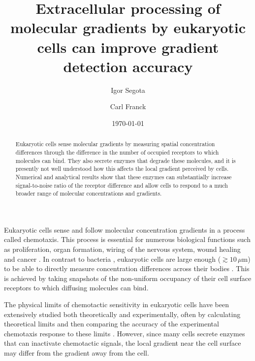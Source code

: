 \documentclass[%
 reprint,
 amsmath,amssymb,
 aps,prl,
 showpacs,
 linenumbers
]{revtex4-1}
\begin{document}


\title{Extracellular processing of molecular gradients by eukaryotic cells can improve gradient detection accuracy}

\author{Igor Segota}
\author{Carl Franck}%

\date{\today}

\begin{abstract}

Eukaryotic cells sense molecular gradients by measuring spatial concentration differences through the difference in the number of occupied receptors to which molecules can bind. They also secrete enzymes that degrade these molecules, and it is presently not well understood how this affects the local gradient perceived by cells. Numerical and analytical results show that these enzymes can substantially increase signal-to-noise ratio of the receptor difference and allow cells to respond to a much broader range of molecular concentrations and gradients. 

\end{abstract}

\maketitle

%
%
%
%
Eukaryotic cells sense and follow molecular concentration gradients
in a process called chemotaxis. This process is essential for numerous biological functions
such as proliferation, organ formation, wiring of the nervous system,
wound healing and cancer \cite{review1,cancer-rev,zigchemotaxis}.
In contrast to bacteria \cite{bacteriaChemo}, eukaryotic cells are
large enough ($\gtrsim10\,\mu\mathrm{m}$) to be able
to directly measure concentration differences across their bodies
\cite{bergpurcell}. This is achieved by taking
snapshots of the non-uniform occupancy of their cell surface receptors
to which diffusing molecules can bind.

The physical limits of chemotactic sensitivity in eukaryotic cells
have been extensively studied both theoretically and experimentally,
often by calculating theoretical limits and then comparing the accuracy
of the experimental chemotaxis response to these limits \cite{bergpurcell,wing1,wing2,
rappelherbie1,rappelherbie2,rappelherbie3,fuller-1,shib,song,eberhard1,eberhard2,me}.
However, since many cells secrete enzymes that can inactivate chemotactic signals, the local gradient near the cell surface may differ from the gradient away from the cell.
\end{document}
